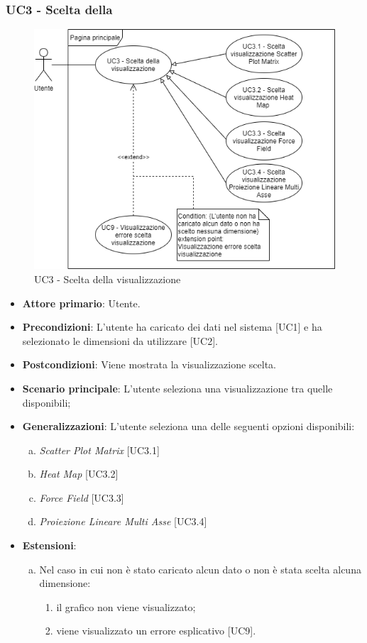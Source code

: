 \subsubsection{UC3 - Scelta della }
\begin{figure}[h]
\includegraphics[width=\linewidth]{section/Images/UC3.png}
\centering
\caption{UC3 - Scelta della visualizzazione}
\end{figure}
\begin{itemize}
	\item \textbf{Attore primario}: Utente.
	\item \textbf{Precondizioni}: L'utente ha caricato dei dati nel sistema [UC1] e ha selezionato le dimensioni da utilizzare [UC2].
	\item \textbf{Postcondizioni}: Viene mostrata la visualizzazione scelta.
	\item \textbf{Scenario principale}: L'utente seleziona una visualizzazione tra quelle disponibili;
	\item \textbf{Generalizzazioni}: L'utente seleziona una delle seguenti opzioni disponibili:
		\begin{enumerate}[(a)]
			\item \textit{Scatter Plot Matrix} [UC3.1]
			\item \textit{Heat Map} [UC3.2]
			\item \textit{Force Field} [UC3.3]
			\item \textit{Proiezione Lineare Multi Asse} [UC3.4]
		\end{enumerate}
	\item \textbf{Estensioni}:
	\begin{enumerate}[(a)]
		\item Nel caso in cui non è stato caricato alcun dato o non è stata scelta alcuna dimensione:
		\begin{enumerate}[1.]
			\item il grafico non viene visualizzato;
			\item viene visualizzato un errore esplicativo [UC9].
		\end{enumerate}
	\end{enumerate}
\end{itemize}